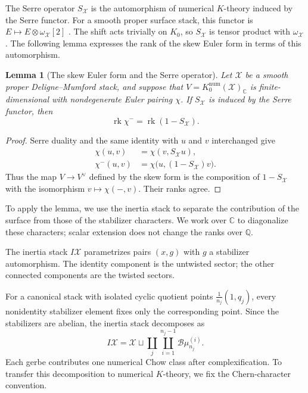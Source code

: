 \documentclass[11pt]{article}
\theoremstyle{plain}
\newtheorem{lemma}[theorem]{Lemma}
\theoremstyle{definition}
\theoremstyle{remark}
\newcommand{\cX}{\mathcal X}
\newcommand{\rk}{\operatorname{rk}}
\newcommand{\C}{\mathbb C}
\newcommand{\Q}{\mathbb Q}
\newcommand{\1}{\mathbf 1}
\begin{document}
The Serre operator $S_{\cX}$ is the automorphism of numerical $K$-theory induced by the Serre functor.  For a smooth proper surface stack, this functor is $E\mapsto E\otimes\omega_{\cX}[2]$ \cite[Theorem 2.22]{NironiDuality}.  The shift acts trivially on $K_0$, so $S_{\cX}$ is tensor product with $\omega_{\cX}$.  The following lemma expresses the rank of the skew Euler form in terms of this automorphism.

\begin{lemma}[The skew Euler form and the Serre operator]\label{lem:skew-serre}
Let $\cX$ be a smooth proper Deligne--Mumford stack, and suppose that $V=K_0^{\mathrm{num}}(\cX)_{\C}$ is finite-dimensional with nondegenerate Euler pairing $\chi$.  If $S_{\cX}$ is induced by the Serre functor, then
\begin{equation}\label{eq:skew-serre-rank}
\rk\chi^-=\rk(1-S_{\cX}).
\end{equation}
\end{lemma}

\begin{proof}
Serre duality and the same identity with $u$ and $v$ interchanged give
\[
\begin{aligned}
\chi(u,v)&=\chi(v,S_{\cX}u),\\
\chi^-(u,v)&=\chi\bigl(u,(1-S_{\cX})v\bigr).
\end{aligned}
\]
Thus the map $V\to V^\vee$ defined by the skew form is the composition of $1-S_{\cX}$ with the isomorphism $v\mapsto\chi(-,v)$.  Their ranks agree.
\end{proof}

To apply the lemma, we use the inertia stack to separate the contribution of the surface from those of the stabilizer characters.  We work over $\C$ to diagonalize these characters; scalar extension does not change the ranks over $\Q$.

The inertia stack $I\cX$ parametrizes pairs $(x,g)$ with $g$ a stabilizer automorphism.  The identity component is the untwisted sector; the other connected components are the twisted sectors.

For a canonical stack with isolated cyclic quotient points $\frac1{n_j}(1,q_j)$, every nonidentity stabilizer element fixes only the corresponding point.  Since the stabilizers are abelian, the inertia stack decomposes as
\begin{equation}\label{eq:inertia-components}
I\cX=\cX\sqcup\coprod_j\coprod_{i=1}^{n_j-1}\mathcal B\mu_{n_j}^{(i)}.
\end{equation}
Each gerbe contributes one numerical Chow class after complexification.  To transfer this decomposition to numerical $K$-theory, we fix the Chern-character convention.
\end{document}
